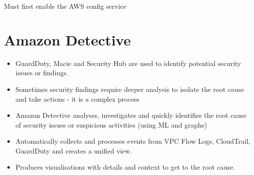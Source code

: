 Must first enable the AWS config service


\section{Amazon Detective}
\begin{itemize}
    \item GuardDuty, Macie and Security Hub are used to identify potential security issues or findings.
    \item Sometimes security findings require deeper analysis to isolate the root cause and take actions - it is a complex process
    \item Amazon Detective analyses, investigates and quickly identifies the root cause of security issues or suspicious activities (using ML and graphs)
    \item Automatically collects and processes events from VPC Flow Logs, CloudTrail, GuardDuty and creates a unified view.
    \item Produces visualisations with details and context to get to the root cause.
\end{itemize}
